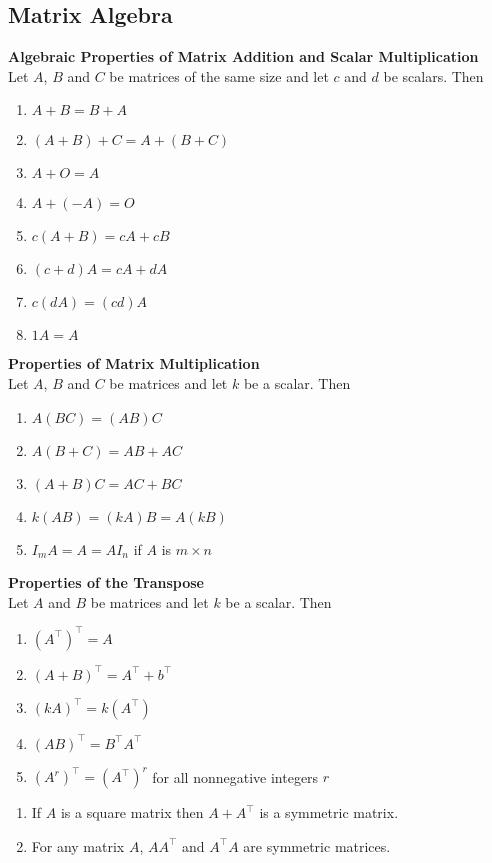 \documentclass{article}
\begin{document}
\subsection{Matrix Algebra}
\begin{theorem}
	\textbf{Algebraic Properties of Matrix Addition and Scalar Multiplication}\\
	Let $A$, $B$ and $C$ be matrices of the same size and let $c$ and $d$ be scalars. Then
	\begin{enumerate}
		\item $A+B=B+A$
		\item $(A+B)+C=A+(B+C)$
		\item $A+O=A$
		\item $A+(-A)=O$
		\item $c(A+B)=cA + cB$
		\item $(c+d)A = cA+dA$
		\item $c(dA) = (cd)A$
		\item $1A=A$
	\end{enumerate}
\end{theorem}
\begin{theorem}
	\textbf{Properties of Matrix Multiplication}\\
	Let $A$, $B$ and $C$ be matrices and let $k$ be a scalar. Then
	\begin{enumerate}
		\item $A(BC) = (AB)C$
		\item $A(B+C) = AB + AC$
		\item $(A + B)C = AC + BC$
		\item $k(AB) = (kA)B = A(kB)$
		\item $I_mA=A=AI_n$ if $A$ is $m\times n$
	\end{enumerate}
\end{theorem}
\begin{theorem}
	\textbf{Properties of the Transpose}\\
	Let $A$ and $B$ be matrices and let $k$ be a scalar. Then
	\begin{enumerate}
		\item $(A^\intercal)^\intercal = A$
		\item $(A+B)^\intercal = A^\intercal + b^\intercal$
		\item $(kA)^\intercal = k(A^\intercal)$
		\item $(AB)^\intercal = B^\intercal A^\intercal$
		\item $(A^r)^\intercal = (A^\intercal)^r$ for all nonnegative integers $r$
	\end{enumerate}
\end{theorem}
\begin{theorem}
	\begin{enumerate}
		\item If $A$ is a square matrix then $A+A^\intercal$ is a symmetric matrix.
		\item For any matrix $A$, $AA^\intercal$ and $A^\intercal A$ are symmetric matrices.
	\end{enumerate}
\end{theorem}
\end{document}
